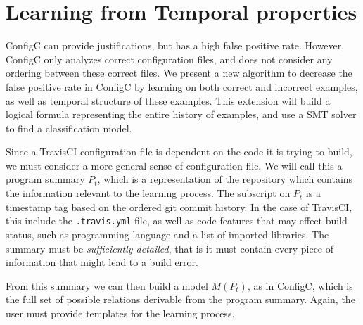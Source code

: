 \section{Learning from Temporal properties}


ConfigC can provide justifications, but has a high false positive rate.
However, ConfigC only analyzes correct configuration files, and does not consider any ordering between these correct files.
We present a new algorithm to decrease the false positive rate in ConfigC by learning on both correct and incorrect examples, as well as temporal structure of these examples.
This extension will build a logical formula representing the entire history of examples, and use a SMT solver to find a classification model.

Since a TravisCI configuration file is dependent on the code it is trying to build, we must consider a more general sense of configuration file.
We will call this a program summary $P_t$, which is a representation of the repository which contains the information relevant to the learning process.
The subscript on $P_t$ is a timestamp tag based on the ordered git commit history.
In the case of TravisCI, this include the \verb|.travis.yml| file, as well as code features that may effect build status, such as programming language and a list of imported libraries.
The summary must be \textit{sufficiently detailed}, that is it must contain every piece of information that might lead to a build error.


From this summary we can then build a model $M(P_t)$, as in ConfigC, which is the full set of possible relations derivable from the program summary.
Again, the user must provide templates for the learning process.

